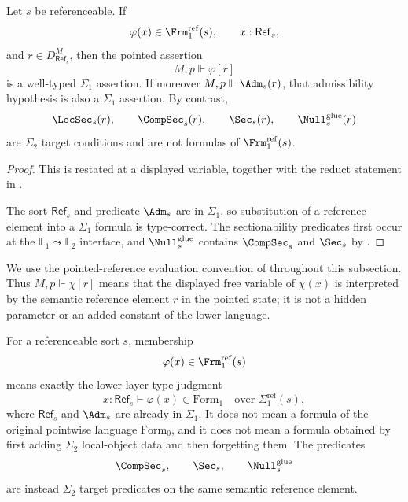 \begin{corollary}\label{cor:well-typed-lower-comparison}
Let $s$ be referenceable. If
\[
\varphi(x)\in \Frm_1^{\mathrm{ref}}(s),
\qquad
x:\mathsf{Ref}_s,
\]
and $r\in D_{\mathsf{Ref}_s}^M$, then the pointed assertion
\[
M,p\Vdash\varphi[r]
\]
is a well-typed $\Sigma_1$ assertion. If moreover $M,p\Vdash\Adm_s(r)$, that admissibility hypothesis is also a $\Sigma_1$ assertion. By contrast,
\[
\LocSec_s(r),\qquad \CompSec_s(r),\qquad \Sec_s(r),
\qquad \Null_s^{\mathrm{glue}}(r)
\]
are $\Sigma_2$ target conditions and are not formulas of $\Frm_1^{\mathrm{ref}}(s)$.
\end{corollary}

\begin{proof}
This is  restated at a displayed variable, together with the reduct statement in .

The sort $\mathsf{Ref}_s$ and predicate $\Adm_s$ are in $\Sigma_1$, so substitution of a reference element into a $\Sigma_1$ formula is type-correct. The sectionability predicates first occur at the $\mathbb L_1\leadsto\mathbb L_2$ interface, and $\Null_s^{\mathrm{glue}}$ contains $\CompSec_s$ and $\Sec_s$ by .
\end{proof}

We use the pointed-reference evaluation convention of  throughout this subsection. Thus $M,p\Vdash\chi[r]$ means that the displayed free variable of $\chi(x)$ is interpreted by the semantic reference element $r$ in the pointed state; it is not a hidden parameter or an added constant of the lower language.

\begin{lemma}\label{lem:no-type-shift-comparison-fragment}
For a referenceable sort $s$, membership
\[
\varphi(x)\in\Frm_1^{\mathrm{ref}}(s)
\]
means exactly the lower-layer type judgment
\[
x:\mathsf{Ref}_s\vdash \varphi(x)\in\mathrm{Form}_1
\quad\text{over }\Sigma_1^{\mathrm{ref}}(s),
\]
where $\mathsf{Ref}_s$ and $\Adm_s$ are already in $\Sigma_1$. It does not mean a formula of the original pointwise language $\mathrm{Form}_0$, and it does not mean a formula obtained by first adding $\Sigma_2$ local-object data and then forgetting them. The predicates
\[
\CompSec_s,\qquad \Sec_s,\qquad \Null_s^{\mathrm{glue}}
\]
are instead $\Sigma_2$ target predicates on the same semantic reference element.
\end{lemma}

